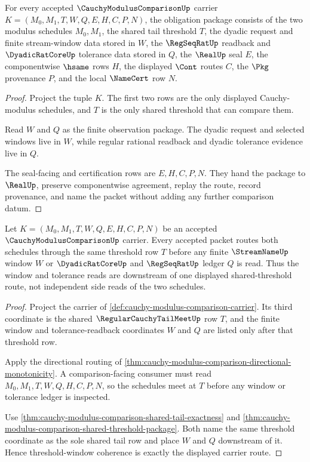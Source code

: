 \begin{theorem}
\label{thm:cauchy-modulus-comparison-shared-threshold-package}
For every accepted $\CauchyModulusComparisonUp$ carrier $K=(M_0,M_1,T,W,Q,E,H,C,P,N)$, the obligation package consists of the two modulus schedules $M_0,M_1$, the shared tail threshold $T$, the dyadic request and finite stream-window data stored in $W$, the $\RegSeqRatUp$ readback and $\DyadicRatCoreUp$ tolerance data stored in $Q$, the $\RealUp$ seal $E$, the componentwise $\hsame$ rows $H$, the displayed $\Cont$ routes $C$, the $\Pkg$ provenance $P$, and the local $\NameCert$ row $N$.
\end{theorem}
\begin{proof}
Project the tuple $K$. The first two rows are the only displayed Cauchy-modulus schedules, and $T$ is the only shared threshold that can compare them.

Read $W$ and $Q$ as the finite observation package. The dyadic request and selected windows live in $W$, while regular rational readback and dyadic tolerance evidence live in $Q$.

The seal-facing and certification rows are $E,H,C,P,N$. They hand the package to $\RealUp$, preserve componentwise agreement, replay the route, record provenance, and name the packet without adding any further comparison datum.
\end{proof}

\begin{theorem}
\label{thm:cauchy-modulus-comparison-threshold-window-coherence}
Let $K=(M_0,M_1,T,W,Q,E,H,C,P,N)$ be an accepted $\CauchyModulusComparisonUp$ carrier. Every accepted packet routes both schedules through the same threshold row $T$ before any finite $\StreamNameUp$ window $W$ or $\DyadicRatCoreUp$ and $\RegSeqRatUp$ ledger $Q$ is read. Thus the window and tolerance reads are downstream of one displayed shared-threshold route, not independent side reads of the two schedules.
\end{theorem}
\begin{proof}
Project the carrier of \autoref{def:cauchy-modulus-comparison-carrier}. Its third coordinate is the shared $\RegularCauchyTailMeetUp$ row $T$, and the finite window and tolerance-readback coordinates $W$ and $Q$ are listed only after that threshold row.

Apply the directional routing of \autoref{thm:cauchy-modulus-comparison-directional-monotonicity}. A comparison-facing consumer must read $M_0,M_1,T,W,Q,H,C,P,N$, so the schedules meet at $T$ before any window or tolerance ledger is inspected.

Use \autoref{thm:cauchy-modulus-comparison-shared-tail-exactness} and \autoref{thm:cauchy-modulus-comparison-shared-threshold-package}. Both name the same threshold coordinate as the sole shared tail row and place $W$ and $Q$ downstream of it. Hence threshold-window coherence is exactly the displayed carrier route.
\end{proof}

